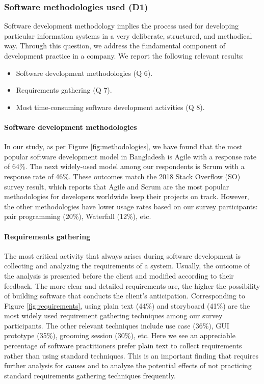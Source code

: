 \subsubsection{Software methodologies used (D1)}
\label{methodology}

Software development methodology implies the process used for developing particular information systems in a very deliberate, structured, and methodical way. Through this question, we address the fundamental component of development practice in a company. We report the following relevant results:

\begin{itemize}
\item Software development methodologies (Q 6).
\item Requirements gathering (Q 7).
\item Most time-consuming software development activities (Q 8).
\end{itemize}


\paragraph{Software development methodologies}
In our study, as per Figure \ref{fig:methodologies}, we have found that the most popular software development model in Bangladesh is Agile with a response rate of 64\%. The next widely-used model among our respondents is Scrum with a response rate of 46\%. These outcomes match the 2018 Stack Overflow (SO) survey \cite{StackoverflowSurvey2018} result, which reports that Agile and Scrum are the most popular methodologies for developers worldwide keep their projects on track. However, the other methodologies have lower usage rates based on our survey participants: pair programming (20\%), Waterfall (12\%), etc.


\paragraph{Requirements gathering}
The most critical activity that always arises during software development is collecting and analyzing the requirements of a system. Usually, the outcome of the analysis is presented before the client and modified according to their feedback. The more clear and detailed requirements are, the higher the possibility of building software that conducts the client’s anticipation. Corresponding to Figure \ref{fig:requirements}, using plain text (44\%) and storyboard (41\%) are the most widely used requirement gathering techniques among our survey participants. The other relevant techniques include use case (36\%), GUI prototype (35\%), grooming session (30\%), etc. Here we see an appreciable percentage of software practitioners prefer plain text to collect requirements rather than using standard techniques. This is an important finding that requires further analysis for causes and to analyze the potential effects of not practicing standard requirements gathering techniques frequently.

